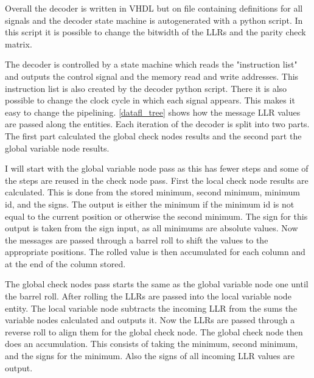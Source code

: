 Overall the decoder is written in VHDL but on file containing definitions for all signals and the decoder state machine is autogenerated with a python script. In this script it is possible to change the bitwidth of the LLRs and the parity check matrix.

The decoder is controlled by a state machine which reads the "instruction list" and outputs the control signal and the memory read and write addresses. This instruction list is also created by the decoder python script. There it is also possible to change the clock cycle in which each signal appears. This makes it easy to change the pipelining. \cref{datafl_tree} shows how the message LLR values are passed along the entities. Each iteration of the decoder is split into two parts. The first part calculated the global check nodes results and the second part the global variable node results.

I will start with the global variable node pass as this has fewer steps and some of the steps are reused in the check node pass. First the local check node results are calculated. This is done from the stored minimum, second minimum, minimum id, and the signs. The output is either the minimum if the minimum id is not equal to the current position or otherwise the second minimum. The sign for this output is taken from the sign input, as all minimums are absolute values. Now the messages are passed through a barrel roll to shift the values to the appropriate positions. The rolled value is then accumulated for each column and at the end of the column stored. 

The global check nodes pass starts the same as the global variable node one until the barrel roll. After rolling the LLRs are passed into the local variable node entity. The local variable node subtracts the incoming LLR from the sums the variable nodes calculated and outputs it. Now the LLRs are passed through a reverse roll to align them for the global check node. The global check node then does an accumulation. This consists of taking the minimum, second minimum, and the signs for the minimum. Also the signs of all incoming LLR values are output.

